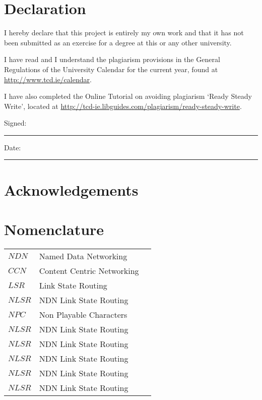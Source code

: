 \section*{\Huge{Declaration}}
\vspace{1cm}
I hereby declare that this project is entirely my own work and that it has not been submitted as an exercise for a degree at this or any other university.

\vspace{1cm}
I have read and I understand the plagiarism provisions in the General Regulations of the University Calendar for the current year, found at \url{http://www.tcd.ie/calendar}.
\vspace{1cm}

I have also completed the Online Tutorial on avoiding plagiarism `Ready Steady Write', located at
\url{http://tcd-ie.libguides.com/plagiarism/ready-steady-write}.
\vspace{3cm}

Signed:~\rule{5cm}{0.3pt}\hfill Date:~\rule{5cm}{0.3pt}

\newpage
\onehalfspacing
\raggedright %

\section*{\Huge{Acknowledgements}}

\tableofcontents
\listoffigures
\listoftables
\lstlistoflistings
\newpage


\section*{\Huge{Nomenclature}}
\begin{tabular}{lp{15cm}l}
    $NDN$ & Named Data Networking \\
    $CCN$ & Content Centric Networking \\
    $LSR$ & Link State Routing \\
    $NLSR$ & NDN Link State Routing \\
    $NPC$ & Non Playable Characters \\
    $NLSR$ & NDN Link State Routing \\
    $NLSR$ & NDN Link State Routing \\
    $NLSR$ & NDN Link State Routing \\
    $NLSR$ & NDN Link State Routing \\
    $NLSR$ & NDN Link State Routing \\
\end{tabular}
\vspace{2cm}
